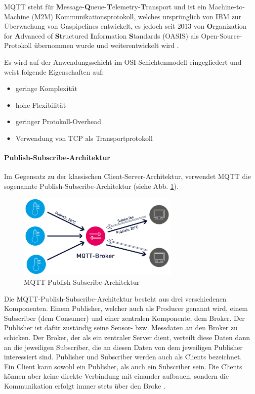 MQTT steht für \textbf{M}essage-\textbf{Q}ueue-\textbf{T}elemetry-\textbf{T}ransport und ist ein Machine-to-Machine (M2M) Kommunikationsprotokoll, welches ursprünglich von IBM zur Überwachung von Gaspipelines entwickelt, es jedoch seit 2013 von \textbf{O}rganization for \textbf{A}dvanced of \textbf{S}tructured \textbf{I}nformation \textbf{S}tandards (OASIS) als Open-Source-Protokoll übernommen wurde und weiterentwickelt wird \cite{Mangel2019}. 

Es wird auf der Anwendungsschicht im OSI-Schichtenmodell eingegliedert und weist folgende Eigenschaften auf:

\begin{itemize}
 \item geringe Komplexität 
 \item hohe Flexibilität 
 \item geringer Protokoll-Overhead 
 \item Verwendung von TCP als Transportprotokoll
\end{itemize}

\paragraph{Publish-Subscribe-Architektur}

Im Gegensatz zu der klassischen Client-Server-Architektur, verwendet MQTT die sogenannte Publish-Subscribe-Architektur (siehe Abb. \ref{fig:mqtt-architektur}).

\begin{figure}[h]
 \centering
 \includegraphics[width=0.7\textwidth]{pictures/mqtt-architecture}
 \caption[MQTT Publish-Subscribe-Architektur]{MQTT Publish-Subscribe-Architektur \cite{Mqtt2022}}
 \label{fig:mqtt-architektur}
\end{figure}

Die MQTT-Publish-Subscribe-Architektur besteht aus drei verschiedenen Komponenten. Einem Publisher, welcher auch als Producer genannt wird, einem Subscriber (dem Consumer) und einer zentralen Komponente, dem Broker. Der Publisher ist dafür zuständig seine Sensor- bzw. Messdaten an den Broker zu schicken. Der Broker, der als ein zentraler Server dient, verteilt diese Daten dann an die jeweiligen Subscriber, die an diesen Daten von dem jeweiligen Publisher interessiert sind. Publisher und Subscriber werden auch als Clients bezeichnet. Ein Client kann sowohl ein Publisher, als auch ein Subscriber sein. Die Clients können aber keine direkte Verbindung mit einander aufbauen, sondern die Kommunikation erfolgt immer stets über den Broke \cite{Mangel2019}. 

